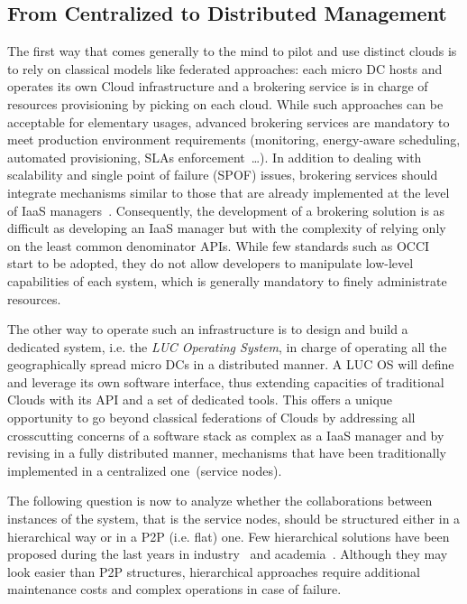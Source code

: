 \documentclass[conference]{IEEEtran}
\begin{document}
\subsection{From Centralized to Distributed Management}
\label{subsec:design-arg}

The first way that comes generally to the mind to pilot and use
distinct clouds is to rely on classical models like federated
approaches: each micro DC hosts and operates
its own Cloud infrastructure and a brokering service is in
charge of resources provisioning by picking on each cloud. While such
approaches can be acceptable for elementary usages, advanced brokering
services are mandatory to meet production environment requirements
(monitoring, energy-aware scheduling, automated provisioning, SLAs
enforcement~\ldots). In addition to dealing with scalability and
single point of failure (SPOF) issues, brokering services should
integrate mechanisms similar to those that are already implemented at
the level of IaaS managers~\cite{houidi:2011}.
Consequently, the development of a brokering
solution is as difficult as developing an IaaS manager but with the
complexity of relying only on the least common denominator APIs.
While few standards such as OCCI~\cite{loutas:2010} start to be
adopted, they do not allow developers to manipulate low-level
capabilities of each system, which is generally mandatory to finely
administrate resources.


The other way to operate such an infrastructure is to design and build a dedicated system,
i.e. the \emph{LUC Operating System}, in charge of operating all the geographically spread
micro DCs in a distributed manner. 
A LUC OS will define and leverage its own software interface, thus
extending capacities of traditional Clouds with its API and a set of dedicated
tools. This
offers a unique opportunity to go beyond classical federations of
Clouds by addressing all
 crosscutting concerns of a software stack as complex as a IaaS manager and by revising in a fully distributed manner, mechanisms that have been traditionally
implemented in a centralized one~(service nodes).

The following question is now to analyze whether the collaborations between instances of
the system, that is the service nodes, should be structured either in a hierarchical way or
in a
P2P (i.e. flat) one. Few hierarchical solutions have been proposed during the last years in
industry~\cite{cascading-os} and
academia~\cite{farahnakian:cloudcom14}. Although they may look easier than
P2P structures, hierarchical approaches require additional maintenance costs and complex
operations in case of failure.
\end{document}
